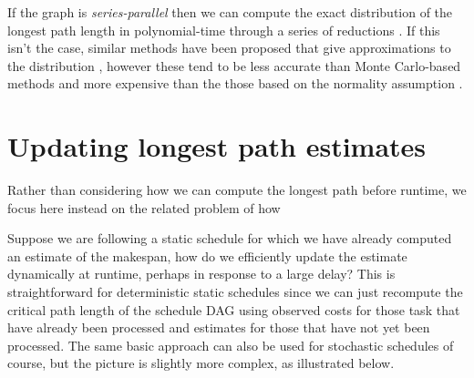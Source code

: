 \documentclass[12pt]{article}
\begin{document}
If the graph is {\em series-parallel} then we can compute the exact distribution of the longest path length in polynomial-time through a series of reductions \cite{dod85,mar65}. If this isn't the case, similar methods have been proposed that give approximations to the distribution \cite{dod85,lud01}, however these tend to be less accurate than Monte Carlo-based methods and more expensive than the those based on the normality assumption \cite{can16}. 


\section{Updating longest path estimates}
\label{sect.updating}


Rather than considering how we can compute the longest path before runtime, we focus here instead on the related problem of how 

Suppose we are following a static schedule for which we have already computed an estimate of the makespan, how do we efficiently update the estimate dynamically at runtime, perhaps in response to a large delay? This is straightforward for deterministic static schedules since we can just recompute the critical path length of the schedule DAG using observed costs for those task that have already been processed and estimates for those that have not yet been processed. The same basic approach can also be used for stochastic schedules of course, but the picture is slightly more complex, as illustrated below.    
\end{document}
